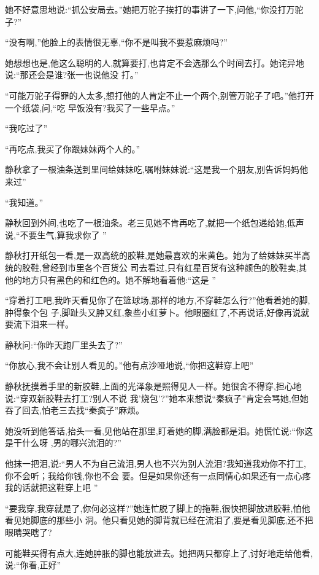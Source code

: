 ﻿\documentclass[12pt]{article}
\begin{document}
她不好意思地说:``抓公安局去。''她把万驼子挨打的事讲了一下,问他,``你没打万驼子?''

``没有啊,''他脸上的表情很无辜,``你不是叫我不要惹麻烦吗?''

她想想也是,他这么聪明的人,就算要打,也肯定不会选那么个时间去打。她诧异地说:``那还会是谁?张一也说他没
打。''

``可能万驼子得罪的人太多,想打他的人肯定不止一个两个\myrule ,别管万驼子了吧。''他打开一个纸袋,问,``吃
早饭没有?我买了一些早点。''

``我吃过了\myrule ''

``再吃点,我买了你跟妹妹两个人的。''

静秋拿了一根油条送到里间给妹妹吃,嘱咐妹妹说:``这是我\myrule 一个朋友,别告诉妈妈他来过\myrule ''

``我知道。''

静秋回到外间,也吃了一根油条。老三见她不肯再吃了,就把一个纸包递给她,低声说,``不要生气,算我求你了
\myrule ''

静秋打开纸包一看,是一双高统的胶鞋,是她最喜欢的米黄色。她为了给妹妹买半高统的胶鞋,曾经到市里各个百货公
司去看过,只有红星百货有这种颜色的胶鞋卖,其他的地方只有黑色的和红色的。她不解地看着他:``这是\myrule 
''

``穿着打工吧,我昨天看见你了\myrule 在篮球场\myrule ,那样的地方,不穿鞋怎么行?''他看着她的脚,肿得象个包
子,脚趾头又肿又红,象些小红萝卜。他眼圈红了,不再说话,好像再说就要流下泪来一样。

静秋问:``你昨天跑厂里头去了?''

``你放心,我不会让别人看见的。''他有点沙哑地说,``你\myrule 把这鞋穿上吧\myrule ''

静秋抚摸着手里的新胶鞋,上面的光泽象是照得见人一样。她很舍不得穿,担心地说:``穿双新胶鞋去打工?别人不说
我'烧包'?''她本来想说``秦疯子''肯定会骂她,但她吞了回去,怕老三去找``秦疯子''麻烦。

她没听到他答话,抬头一看,见他站在那里,盯着她的脚,满脸都是泪。她慌忙说:``你\myrule 这是干什么呀\myrule 
,男的哪兴流泪的?''

他抹一把泪,说:``男人不为自己流泪,男人也不兴为别人流泪?我知道我劝你不打工,你不会听；我给你钱,你也不会
要。但是如果你还有一点同情心\myrule 如果还\myrule 有一点\myrule 心疼我的话\myrule 就把这鞋穿上吧
\myrule ''

``要我穿,我穿就是了,你\myrule 何必这样?''她连忙脱了脚上的拖鞋,很快把脚放进胶鞋,怕他看见她脚底的那些小
洞。他只看见她的脚背就已经在流泪了,要是看见脚底,还不把眼睛哭瞎了?

可能鞋买得有点大,连她肿胀的脚也能放进去。她把两只都穿上了,讨好地走给他看,说:``你看,正好\myrule ''
\end{document}
